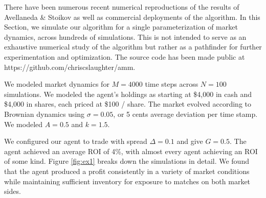 \documentclass{article}
\begin{document}
There have been numerous recent numerical reproductions of the results of Avellaneda \& Stoikov \cite{fushimi2018optimal} as well as commercial deployments of the algorithm. In this Section, we simulate our algorithm for a single parameterization of market dynamics, across hundreds of simulations. This is not intended to serve as an exhaustive numerical study of the algorithm but rather as a pathfinder for further experimentation and optimization. The source code has been made public at https://github.com/chriscslaughter/amm.

We modeled market dynamics for $M=4000$ time steps across $N = 100$ simulations. We modeled the agent's holdings as starting at \$4,000 in cash and \$4,000 in shares, each priced at \$100 / share. The market evolved according to Brownian dynamics using $\sigma = 0.05$, or 5 cents average deviation per time stamp. We modeled $A = 0.5$ and $k = 1.5$.

We configured our agent to trade with spread $\Delta = 0.1$ and give $G = 0.5$. The agent achieved an average ROI of 4\%, with almost every agent achieving an ROI of some kind. Figure \ref{fig:ex1} breaks down the simulations in detail. We found that the agent produced a profit consistently in a variety of market conditions while maintaining sufficient inventory for exposure to matches on both market sides.
\end{document}
